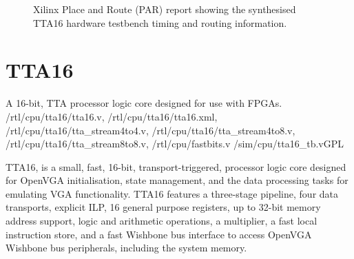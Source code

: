 \begin{figure}[h!]
\begin{center}
\caption[TTA16 synthesis timing report]{Xilinx Place and Route (PAR) report
showing the synthesised TTA16 hardware testbench timing and routing information.}
\label{TTA16_Synthesis}
\end{center}
\end{figure}





\section{TTA16}
\label{TTA16}

{A 16-bit, TTA processor logic core designed for use with FPGAs.}
{/rtl/cpu/tta16/tta16.v, /rtl/cpu/tta16/tta16.xml,
/rtl/cpu/tta16/tta\_stream4to4.v, /rtl/cpu/tta16/tta\_stream4to8.v,
/rtl/cpu/tta16/tta\_stream8to8.v, /rtl/cpu/fastbits.v}
{/sim/cpu/tta16\_tb.v}{GPL}

TTA16, is a small, fast, 16-bit, transport-triggered, processor logic core
designed for OpenVGA initialisation, state management, and the data processing
tasks for emulating VGA functionality. TTA16 features a three-stage pipeline,
four data transports, explicit ILP, 16 general purpose registers, up to 32-bit
memory address support, logic and arithmetic operations, a multiplier, a fast
local instruction store, and a fast Wishbone bus interface to access OpenVGA
Wishbone bus peripherals, including the system memory.


